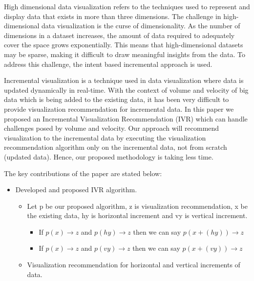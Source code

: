 High dimensional data visualization refers to the techniques used to represent and display data that exists in more than three dimensions. The challenge in high-dimensional data visualization is the curse of dimensionality. As the number of dimensions in a dataset increases, the amount of data required to adequately cover the space grows exponentially. This means that high-dimensional datasets may be sparse, making it difficult to draw meaningful insights from the data. To address this challenge, the intent based incremental approach is used.

Incremental visualization is a technique used in data visualization where data is updated dynamically in real-time. With the context of volume and velocity of big data which is being added to the existing data, it has been very difficult to provide visualization recommendation for incremental data. In this paper we proposed an Incremental Visualization Recommendation (IVR) which can handle challenges posed by volume and velocity. Our approach will recommend visualization to the incremental data by executing the visualization recommendation algorithm only on the incremental data, not from scratch (updated data). Hence, our proposed methodology is taking less time.

The key contributions of the paper are stated below:
\begin{itemize}
    \item Developed and proposed IVR algorithm.
    \begin{itemize}
        \item Let p be our proposed algorithm, z is visualization recommendation, x be the existing data, hy is horizontal increment and vy is vertical increment.
        \begin{itemize}
            \item If \( p(x) \rightarrow z\) and \(p(hy) \rightarrow z\) then we can say \(p(x+(hy)) \rightarrow z\)
            \item If \( p(x) \rightarrow z\) and \(p(vy) \rightarrow z\) then we can say \(p(x+(vy)) \rightarrow z\)
        \end{itemize}
        \item Visualization recommendation for horizontal and vertical increments of data.
    \end{itemize}
\end{itemize}




